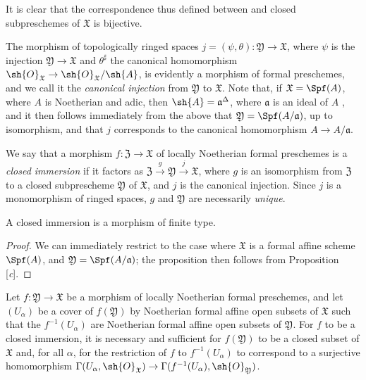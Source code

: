 It is clear that the correspondence thus defined between  and closed subpreschemes of $\mathfrak{X}$ is bijective.

The morphism of topologically ringed spaces $j=(\psi,\theta):\mathfrak{Y}\to\mathfrak{X}$, where $\psi$ is the injection $\mathfrak{Y}\to\mathfrak{X}$ and $\theta^\sharp$ the canonical homomorphism $\sh{O}_\mathfrak{X}\to\sh{O}_\mathfrak{X}/\sh{A}$, is evidently  a morphism of formal preschemes, and we call it the \emph{canonical injection} from $\mathfrak{Y}$ to $\mathfrak{X}$.
Note that, if $\mathfrak{X}=\Spf(A)$, where $A$ is Noetherian and adic, then $\sh{A}=\mathfrak{a}^\Delta$, where $\mathfrak{a}$ is an ideal of $A$ , and it then follows immediately from the above that $\mathfrak{Y}=\Spf(A/\mathfrak{a})$, up to isomorphism, and that $j$ corresponds  to the canonical homomorphism $A\to A/\mathfrak{a}$.

We say that a morphism $f:\mathfrak{Z}\to\mathfrak{X}$ of locally Noetherian formal preschemes is a \emph{closed immersion} if it factors as $\mathfrak{Z}\xrightarrow{g}\mathfrak{Y}\xrightarrow{j}\mathfrak{X}$, where $g$ is an isomorphism from $\mathfrak{Z}$ to a closed subprescheme $\mathfrak{Y}$ of $\mathfrak{X}$, and $j$ is the canonical injection.
Since $j$ is a monomorphism of ringed spaces, $g$ and $\mathfrak{Y}$ are necessarily \emph{unique}.

\begin{proposition}[10.14.3]
\label{I.10.14.3}
A closed immersion is a morphism of finite type.
\end{proposition}

\begin{proof}
We can immediately restrict to the case where $\mathfrak{X}$ is a formal affine scheme $\Spf(A)$, and $\mathfrak{Y}=\Spf(A/\mathfrak{a})$;
the proposition then follows from Proposition [\emph{c}].
\end{proof}

\begin{lemma}[10.14.4]
\label{I.10.14.4}
Let $f:\mathfrak{Y}\to\mathfrak{X}$ be a morphism of locally Noetherian formal preschemes, and let $(U_\alpha)$ be a cover of $f(\mathfrak{Y})$ by Noetherian formal affine open subsets of $\mathfrak{X}$ such that the $f^{-1}(U_\alpha)$ are Noetherian formal affine open subsets of $\mathfrak{Y}$.
For $f$ to be a closed immersion, it is necessary and sufficient for $f(\mathfrak{Y})$ to be a closed subset of $\mathfrak{X}$ and, for all $\alpha$, for the restriction of $f$ to $f^{-1}(U_\alpha)$ to correspond  to a surjective homomorphism $\Gamma(U_\alpha,\sh{O}_\mathfrak{X})\to\Gamma(f^{-1}(U_\alpha),\sh{O}_\mathfrak{Y})$.
\end{lemma}

